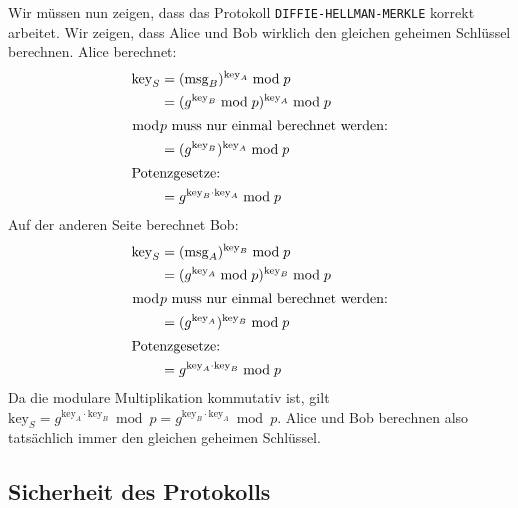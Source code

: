 Wir müssen nun zeigen, dass das Protokoll \texttt{DIFFIE-HELLMAN-MERKLE} korrekt arbeitet. Wir zeigen, dass Alice und Bob wirklich den gleichen geheimen Schlüssel berechnen. Alice berechnet:
\begin{align*}
	\text{key}_S	& = (\text{msg}_B)^{\text{key}_A} \bmod p \\
					& = (g^{\text{key}_B} \bmod p)^{\text{key}_A} \bmod p \\
					\shortintertext{\centering $\bmod p$ muss nur einmal berechnet werden:}
					& = (g^{\text{key}_B})^{\text{key}_A} \bmod p \\
										\shortintertext{\centering Potenzgesetze:}
					& = g^{\text{key}_B \cdot \text{key}_A} \bmod p
\end{align*}
Auf der anderen Seite berechnet Bob:
\begin{align*}
	\text{key}_S	& = (\text{msg}_A)^{\text{key}_B} \bmod p \\
					& = (g^{\text{key}_A} \bmod p)^{\text{key}_B} \bmod p \\
					\shortintertext{\centering $\bmod p$ muss nur einmal berechnet werden:}
					& = (g^{\text{key}_A})^{\text{key}_B} \bmod p \\
										\shortintertext{\centering Potenzgesetze:}
					& = g^{\text{key}_A \cdot \text{key}_B} \bmod p
\end{align*}
Da die modulare Multiplikation kommutativ ist, gilt $\text{key}_S = g^{\text{key}_A \cdot \text{key}_B} \bmod p = g^{\text{key}_B \cdot \text{key}_A} \bmod p$. Alice und Bob berechnen also tatsächlich immer den gleichen geheimen Schlüssel. 

\subsection{Sicherheit des Protokolls}

